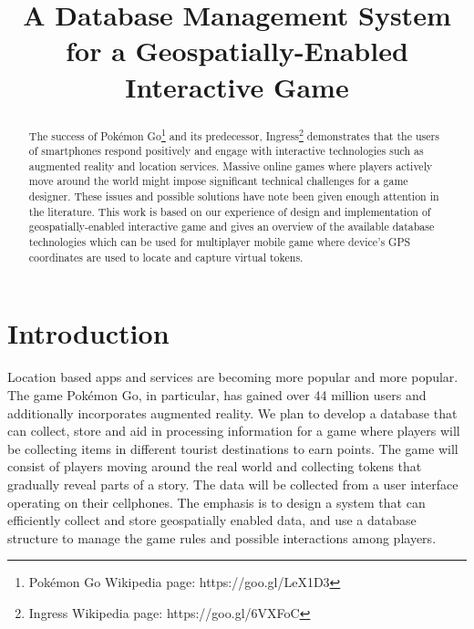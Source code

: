 \documentclass[conference]{IEEEtran}
\begin{document}
\title{A Database Management System for a Geospatially-Enabled Interactive Game}
\author{
\and
{}
\and
{}
\and
{}
}

\maketitle

\begin{abstract}
The success of Pokémon Go\footnote[1]{Pokémon Go Wikipedia page: https://goo.gl/LeX1D3} and its predecessor, Ingress\footnote[2]{Ingress Wikipedia page: https://goo.gl/6VXFoC} demonstrates that the users of smartphones respond positively and engage with interactive technologies such as augmented reality and location services. Massive online games where players actively move around the world might impose significant technical challenges for a game designer. These issues and possible solutions have note been given enough attention in the literature. This work is based on our experience of design and implementation of geospatially-enabled interactive game and gives an overview of the available database technologies which can be used for multiplayer mobile game where device's GPS coordinates are used to locate and capture virtual tokens. 
\end{abstract}

\IEEEpeerreviewmaketitle

\section{Introduction}
Location based apps and services are becoming more popular and more popular. The game Pokémon Go, in particular, has gained over 44 million users and additionally incorporates augmented reality. We plan to develop a database that can collect, store and aid in processing information for a game where players will be collecting items in different tourist destinations to earn points. The game will consist of players moving around the real world and collecting tokens that gradually reveal parts of a story. The data will be collected from a user interface operating on their cellphones. The emphasis is to design a system that can efficiently collect and store geospatially enabled data, and use a database structure to manage the game rules and possible interactions among players. 
\end{document}
